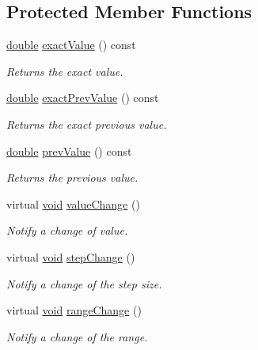 \subsection*{Protected Member Functions}
\begin{DoxyCompactItemize}
\item 
\hyperlink{_super_l_u_support_8h_a8956b2b9f49bf918deed98379d159ca7}{double} \hyperlink{class_qwt_double_range_a705b76d28882d37bc5313d6c38c9a720}{exact\-Value} () const 
\begin{DoxyCompactList}\small\item\em Returns the exact value. \end{DoxyCompactList}\item 
\hyperlink{_super_l_u_support_8h_a8956b2b9f49bf918deed98379d159ca7}{double} \hyperlink{class_qwt_double_range_a595c04ed863eb7f0adaf94440087fe0a}{exact\-Prev\-Value} () const 
\begin{DoxyCompactList}\small\item\em Returns the exact previous value. \end{DoxyCompactList}\item 
\hyperlink{_super_l_u_support_8h_a8956b2b9f49bf918deed98379d159ca7}{double} \hyperlink{class_qwt_double_range_a38768187bef94dd5e5a2c8664746b365}{prev\-Value} () const 
\begin{DoxyCompactList}\small\item\em Returns the previous value. \end{DoxyCompactList}\item 
virtual \hyperlink{group___u_a_v_objects_plugin_ga444cf2ff3f0ecbe028adce838d373f5c}{void} \hyperlink{class_qwt_double_range_a1d50398342d6aa1d9cd86650ee29aff8}{value\-Change} ()
\begin{DoxyCompactList}\small\item\em Notify a change of value. \end{DoxyCompactList}\item 
virtual \hyperlink{group___u_a_v_objects_plugin_ga444cf2ff3f0ecbe028adce838d373f5c}{void} \hyperlink{class_qwt_double_range_a86641f8755ed172ca4cf72d36df539ca}{step\-Change} ()
\begin{DoxyCompactList}\small\item\em Notify a change of the step size. \end{DoxyCompactList}\item 
virtual \hyperlink{group___u_a_v_objects_plugin_ga444cf2ff3f0ecbe028adce838d373f5c}{void} \hyperlink{class_qwt_double_range_a3583134a1ac32706aa4742088bb9d4dc}{range\-Change} ()
\begin{DoxyCompactList}\small\item\em Notify a change of the range. \end{DoxyCompactList}\end{DoxyCompactItemize}


